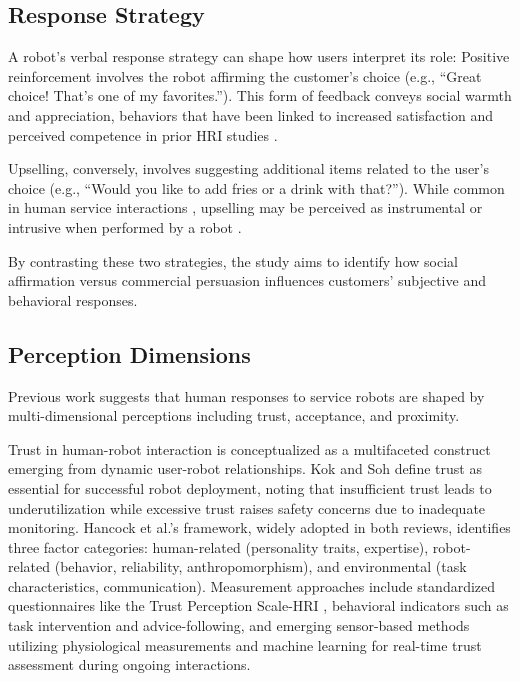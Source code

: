 \documentclass[conference]{IEEEtran}
\begin{document}
\subsection{Response Strategy}
A robot's verbal response strategy can shape how users interpret its role: Positive reinforcement involves the robot affirming the customer's choice (e.g., ``Great choice! That's one of my favorites.''). This form of feedback conveys social warmth and appreciation, behaviors that have been linked to increased satisfaction and perceived competence in prior HRI studies \cite{b14, b15}.

Upselling, conversely, involves suggesting additional items related to the user's choice (e.g., ``Would you like to add fries or a drink with that?''). While common in human service interactions \cite{b16}, upselling may be perceived as instrumental or intrusive when performed by a robot \cite{b17}.

By contrasting these two strategies, the study aims to identify how social affirmation versus commercial persuasion influences customers' subjective and behavioral responses.

\subsection{Perception Dimensions}
Previous work suggests that human responses to service robots are shaped by multi-dimensional perceptions including trust, acceptance, and proximity.

Trust in human-robot interaction is conceptualized as a multifaceted construct emerging from dynamic user-robot relationships. Kok and Soh \cite{b18} define trust as essential for successful robot deployment, noting that insufficient trust leads to underutilization while excessive trust raises safety concerns due to inadequate monitoring. Hancock et al.'s \cite{b6} framework, widely adopted in both reviews, identifies three factor categories: human-related (personality traits, expertise), robot-related (behavior, reliability, anthropomorphism), and environmental (task characteristics, communication). Measurement approaches include standardized questionnaires like the Trust Perception Scale-HRI \cite{b20}, behavioral indicators such as task intervention and advice-following, and emerging sensor-based methods utilizing physiological measurements and machine learning for real-time trust assessment during ongoing interactions.
\end{document}
